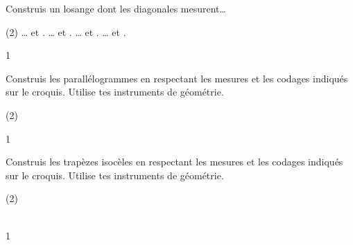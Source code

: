\documentclass[a4paper,11pt]{report}
\begin{document}
\begin{exo}{
Construis un losange dont les diagonales mesurent\ldots
\begin{tasks}(2)
    \task \ldots {} et .
    \task \ldots {} et .
    \task \ldots {} et .
    \task \ldots {} et .
\end{tasks}
}{1}
\end{exo}




\begin{exo}{
Construis les parallélogrammes en respectant les mesures et les codages indiqués sur le croquis. Utilise tes instruments de géométrie.
\begin{tasks}(2)
    \task 

    \task  

    \task 

    \task  
    
\end{tasks}

}{1}
\end{exo}

\newpage
\begin{exo}{
Construis les trapèzes isocèles en respectant les mesures et les codages indiqués sur le croquis. Utilise tes instruments de géométrie.

\begin{tasks}(2)
    \task ~\\ 
    \task ~\\ 
\end{tasks}


}{1}
\end{exo}
\end{document}
